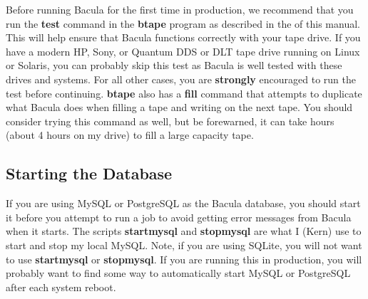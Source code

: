 Before running Bacula for the first time in production, we recommend that you
run the {\bf test} command in the {\bf btape} program as described in the 
 of this manual. This will
help ensure that Bacula functions correctly with your tape drive. If you have
a modern HP, Sony, or Quantum DDS or DLT tape drive running on Linux or
Solaris, you can probably skip this test as Bacula is well tested with these
drives and systems. For all other cases, you are {\bf strongly} encouraged to
run the test before continuing. {\bf btape} also has a {\bf fill} command that
attempts to duplicate what Bacula does when filling a tape and writing on the
next tape. You should consider trying this command as well, but be forewarned,
it can take hours (about 4 hours on my drive) to fill a large capacity tape. 

\subsection*{Starting the Database}
\label{StartDB}

If you are using MySQL or PostgreSQL as the Bacula database, you should start
it before you attempt to run a job to avoid getting error messages from Bacula
when it starts. The scripts {\bf startmysql} and {\bf stopmysql} are what I
(Kern) use to start and stop my local MySQL. Note, if you are using SQLite,
you will not want to use {\bf startmysql} or {\bf stopmysql}. If you are
running this in production, you will probably want to find some way to
automatically start MySQL or PostgreSQL after each system reboot. 

